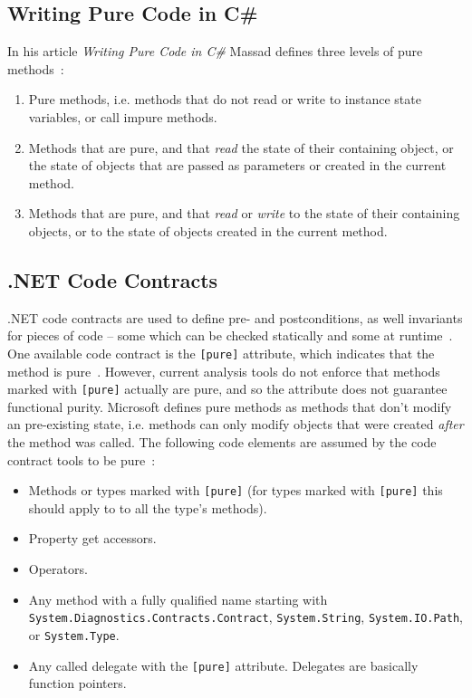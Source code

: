 \documentclass[a4paper,12pt]{article}
\begin{document}

\subsection{Writing Pure Code in C\#} \label{sub:Writing Pure Code in Cs}
In his article \textit{Writing Pure Code in C\#} Massad defines three levels of pure methods~\cite{yacoub-massad-pure-code}:
\begin{enumerate}
  \item Pure methods, i.e. methods that do not read or write to instance state variables, or call impure methods.
  \item Methods that are pure, and that \textit{read} the state of their containing object, or the state of objects that are passed as parameters or created in the current method.
  \item Methods that are pure, and that \textit{read} or \textit{write} to the state of their containing objects, or to the state of objects created in the current method.
\end{enumerate}

\subsection{.NET Code Contracts} \label{sub:Code contracts} %
.NET code contracts are used to define pre- and postconditions, as well invariants for pieces of code -- some which can be checked statically and some at runtime~\cite{microsoft-code-contracts}. One available code contract is the \texttt{[pure]} attribute, which indicates that the method is pure~\cite{microsoft-code-contracts}. However, current analysis tools do not enforce that methods marked with \texttt{[pure]} actually are pure, and so the attribute does not guarantee functional purity. Microsoft defines pure methods as methods that don't modify an pre-existing state, i.e. methods can only modify objects that were created \textit{after} the method was called. The following code elements are assumed by the code contract tools to be pure~\cite{microsoft-code-contracts}:

\begin{itemize}
  \item Methods or types marked with \texttt{[pure]} (for types marked with \texttt{[pure]} this should apply to to all the type's methods).
  \item Property get accessors.
  \item Operators.
  \item Any method with a fully qualified name starting with \texttt{System.Diagnost\-ics.Contracts.Contract}, \texttt{System.String}, \texttt{System\-.IO.Path}, or \texttt{System.Type}.
  \item Any called delegate with the \texttt{[pure]} attribute. Delegates are basically function pointers.
\end{itemize}
\end{document}
